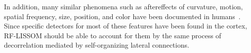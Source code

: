 \documentclass[10pt]{article}   %
\begin{document}
In addition, many similar phenomena such as aftereffects of curvature,
motion, spatial frequency, size, position, and color have been
documented in humans~\cite{barlow:aftereffects}. Since specific
detectors for most of these features have been found in the cortex,
RF-LISSOM should be able to account for them by the same process of
decorrelation mediated by self-organizing lateral connections.

\end{document}
